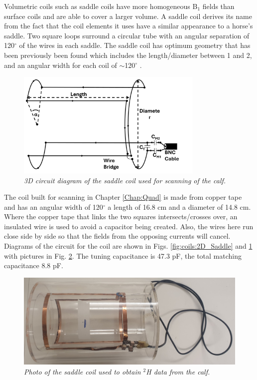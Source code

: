 Volumetric coils such as saddle coils have more homogeneous B$_1$ fields than surface coils and are able to cover a larger volume. A saddle coil derives its name from the fact that the coil elements it uses have a similar appearance to a horse's saddle. Two square loops surround a circular tube with an angular separation of 120$^\circ$ of the wires in each saddle. The saddle coil has optimum geometry that has been previously been found which includes the length/diameter between 1 and 2, and an angular width for each coil of $\sim$120$^\circ$ \cite{Ginsberg1970OptimumField,Salmon2006OptimizationImaging}.

\begin{figure}
    \centering
    \includegraphics[width=0.8\textwidth]{Figures/Coils/3D_Saddle.png}
    \caption{\textit{3D circuit diagram of the saddle coil used for scanning of the calf.}}
    \label{fig:coils:3D_Saddle}
\end{figure}

The coil built for scanning in Chapter \ref{Chap:Quad} is made from copper tape and has an angular width of 120$^\circ$ a length of 16.8 cm and a diameter of 14.8 cm. Where the copper tape that links the two squares intersects/crosses over, an insulated wire is used to avoid a capacitor being created. Also, the wires here run close side by side so that the fields from the opposing currents will cancel. Diagrams of the circuit for the coil are shown in Figs. \ref{fig:coils:2D_Saddle} and \ref{fig:coils:3D_Saddle} with pictures in Fig. \ref{fig:coils:Saddle_pic}. The tuning capacitance is 47.3 pF, the total matching capacitance 8.8 pF.

\begin{figure}
    \centering
    \includegraphics[width=1\textwidth]{Figures/Coils/Saddle_Coil.jpg}
    \caption{\textit{Photo of the saddle coil used to obtain $^2$H data from the calf.}}
    \label{fig:coils:Saddle_pic}
\end{figure}

